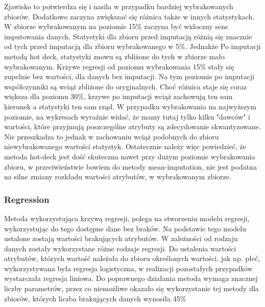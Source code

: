 \documentclass{classrep}
\begin{document}
{{            Zjawisko to potwierdza się i nasila w przypadku bardziej wybrakowanych
            zbiorów. Dodatkowo zaczyna zwiększać się różnica także w innych
            statystykach. W zbiorze wybrakowanym na poziomie 15\% zaczyna być widoczny
            sens imputowania danych. Statystyki dla zbioru przed imputacją różnią się
            znacznie od tych przed imputacją dla zbioru wybrakowanego w 5\%. Jednakże
            Po imputacji metodą hot deck, statystyki znowu są zbliżone do tych w
            zbiorze mało wybrakowanym. Krzywe regresji od poziomu wybrakowania 15\%
            stały się zupełnie bez wartości, dla danych bez imputacji. Na tym poziomie
            po imputacji współczynniki są wciąż zbliżone do oryginalnych. Choć różnica
            staje się coraz większa dla poziomu 30\%, krzywe po imputacji wciąż
            zachowują ten sam kierunek a statystyki ten sam rząd. W przypadku
            wybrakowania na najwyższym poziomie, na wykresach wyraźnie widać, że mamy
            tutaj tylko kilku "dawców" i wartości, które przyjmują poszczególne
            atrybuty są zdecydowanie skwantyzowane. Nie przeszkadza to jednak w
            zachowaniu wciąż podobnych do zbioru niewybrakowanego wartości statystyk.
            Ostatecznie należy więc powiedzieć, że metoda hot-deck jest dość skuteczna
            nawet przy dużym poziomie wybrakowania zbioru, w przeciwieństwie bowiem do
            metody mean-imputation, nie jest podatna na silne zmiany rozkładu wartości
            atrybutów, w wybrakowanym zbiorze.

        }

        \subsubsection{Regression}
        \label{summary:regression} {
            Metoda wykorzystująca krzywą regresji, polega na stworzeniu modelu
            regresji, wykorzystując do tego dostępne dane bez braków. Na podstawie tego
            modelu ustalone zostają wartości brakujących atrybutów. W zależności od
            rodzaju danych zostały wykorzystane różne rodzaje regresji. Do ustalenia
            wartości atrybutów, których wartość należała do zbioru określonych
            wartości, jak np. płeć, wykorzystywana była regresja logistyczna, w
            realizacji pozostałych przypadków wystarczała regresja liniowa. Do
            poprawnego działania metoda wymaga znacznej liczby parametrów, przez co
            niemożliwe okazało się wykorzystanie tej metody dla zbiorów, których liczba
            brakujących danych wynosiła 45\%

}}
\end{document}
